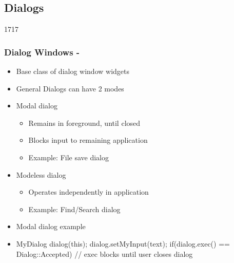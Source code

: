 %
%
%
%

\subsection{Dialogs}

\begin{slide}[fragile]{1717}
\frametitle{Dialog Windows - }
  \begin{itemize}
  \item Base class of dialog window widgets
  \item General Dialogs can have 2 modes
  \item Modal dialog
  \begin{itemize}
  \item Remains in foreground, until closed
 \item Blocks input to remaining application
 \item Example: File save dialog
   \end{itemize}
  \item Modeless dialog
  \begin{itemize}
  \item Operates independently in application
   \item Example: Find/Search dialog
   \end{itemize}
  \item Modal dialog example
 \item[] 
    \begin{cpp}
MyDialog dialog(this);
dialog.setMyInput(text);
if(dialog.exec() == Dialog::Accepted) {
  // exec blocks until user closes dialog
}
    \end{cpp}
  \end{itemize}
\end{slide}

